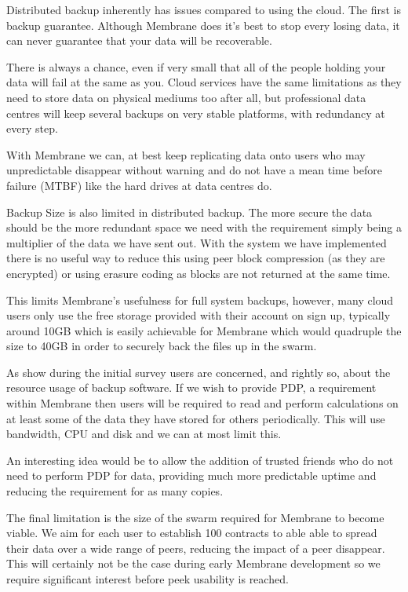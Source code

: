 \documentclass[11pt, a4paper, twocolumn, twoside]{report}
\begin{document}
Distributed backup inherently has issues compared to using the cloud. The first is backup guarantee. Although Membrane does it's best to stop every losing data, it can never guarantee that your data will be recoverable.

There is always a chance, even if very small that all of the people holding your data will fail at the same as you. Cloud services have the same limitations as they need to store data on physical mediums too after all, but professional data centres will keep several backups on very stable platforms, with redundancy at every step.

With Membrane we can, at best keep replicating data onto users who may unpredictable disappear without warning and do not have a mean time before failure (MTBF) like the hard drives at data centres do.

Backup Size is also limited in distributed backup. The more secure the data should be the more redundant space we need with the requirement simply being a multiplier of the data we have sent out. With the system we have implemented there is no useful way to reduce this using peer block compression (as they are encrypted) or using erasure coding as blocks are not returned at the same time.

This limits Membrane's usefulness for full system backups, however, many cloud users only use the free storage provided with their account on sign up, typically around 10GB which is easily achievable for Membrane which would quadruple the size to 40GB in order to securely back the files up in the swarm.

As show during the initial survey users are concerned, and rightly so, about the resource usage of backup software. If we wish to provide PDP, a requirement within Membrane then users will be required to read and perform calculations on at least some of the data they have stored for others periodically. This will use bandwidth, CPU and disk and we can at most limit this.

An interesting idea would be to allow the addition of trusted friends who do not need to perform PDP for data, providing much more predictable uptime and reducing the requirement for as many copies.

The final limitation is the size of the swarm required for Membrane to become viable. We aim for each user to establish 100 contracts to able able to spread their data over a wide range of peers, reducing the impact of a peer disappear. This will certainly not be the case during early Membrane development so we require significant interest before peek usability is reached.
\end{document}
